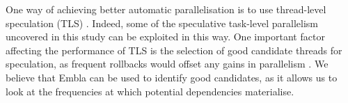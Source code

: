 One way of achieving better automatic parallelisation is to use thread-level speculation (TLS) \cite{Rundberg01anall-software, gregory05stampede, welc05safe}.
Indeed, some of the speculative task-level parallelism uncovered in this study can be exploited in this way.
One important factor affecting the performance of TLS is the selection of good candidate threads for speculation, as frequent rollbacks would offset any gains in parallelism \cite{johnson04mincut, liu06posh}.
We believe that Embla can be used to identify good candidates, as it allows us to look at the frequencies at which potential dependencies materialise.
